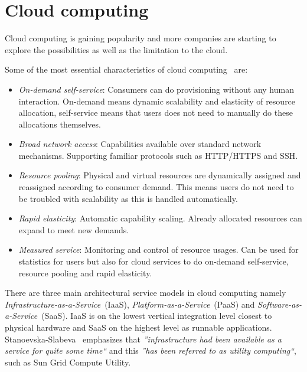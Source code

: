 



\section{Cloud computing}

Cloud computing is gaining popularity and more companies are starting 
to explore the possibilities as well as the limitation to the cloud.

Some of the most essential characteristics of cloud computing~\cite{nist:mell11} are:
\begin{itemize}
  \item \emph{On-demand self-service}: 
    Consumers can do provisioning without any human interaction.
    On-demand means dynamic scalability and elasticity of resource allocation,
    self-service means that users does not need to manually do these allocations themselves.
  \item \emph{Broad network access}: Capabilities available over standard network mechanisms.
    Supporting familiar protocols such as HTTP/HTTPS and SSH.
  \item \emph{Resource pooling}: Physical and virtual resources are dynamically assigned
    and reassigned according to consumer demand.
    This means users do not need to be troubled with scalability as this is handled automatically.
  \item \emph{Rapid elasticity}: Automatic capability scaling.
    Already allocated resources can expand to meet new demands.
  \item \emph{Measured service}: Monitoring and control of resource usages.
    Can be used for statistics for users but also for cloud services to do
    on-demand self-service, resource pooling and rapid elasticity.
\end{itemize}

There are three main architectural service models in cloud computing\cite{nist:mell11}
namely \emph{Infrastructure-as-a-Service}~(IaaS), \emph{Platform-as-a-Service}~(PaaS)
and \emph{Software-as-a-Service}~(SaaS).
IaaS is on the lowest vertical integration level closest to physical hardware and SaaS on the highest
level as runnable applications.
Stanoevska-Slabeva~\cite{introduction:wozniak10} emphasizes that
\emph{''infrastructure had been available as a service for quite some time``} and this 
\emph{''has been referred to as utility computing``}, such as Sun Grid Compute Utility.

